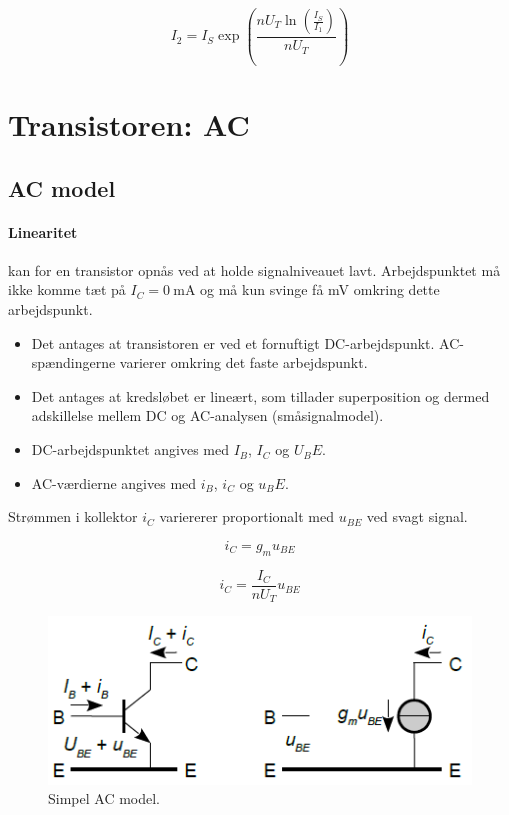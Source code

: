 \documentclass[danish]{article}
\begin{document}
\begin{equation} 
I_2 = I_S \exp{\left(\frac{n U_T \ln{\left(\frac{I_S}{I_1}\right)}}{n U_T}\right)}
\end{equation}

\newpage
\section{Transistoren: AC}
\subsection{AC model}
\paragraph{Linearitet} kan for en transistor opnås ved at holde signalniveauet lavt. Arbejdspunktet må ikke komme tæt på $I_C = \SI{0}{\milli\ampere}$ og må kun svinge få mV omkring dette arbejdspunkt. 

\begin{itemize}
	\item Det antages at transistoren er ved et fornuftigt DC-arbejdspunkt. AC-spændingerne varierer omkring det faste arbejdspunkt.
	\item Det antages at kredsløbet er lineært, som tillader superposition og dermed	adskillelse mellem DC og AC-analysen (småsignalmodel).
	\item DC-arbejdspunktet angives med $I_B$, $I_C$ og $U_BE$.
	\item AC-værdierne angives med $i_B$, $i_C$ og $u_BE$.
\end{itemize}

Strømmen i kollektor $i_C$ variererer proportionalt med $u_{BE}$ ved svagt signal.

\begin{equation} 
i_C = g_m u_{BE}
\end{equation}

\begin{equation} 
i_C = \dfrac{I_C}{n U_T} u_{BE}
\end{equation}

\begin{figure} [H]
	\centering
	\includegraphics[width=0.75\linewidth]{graphics/ACmodel}
	\caption{Simpel AC model.}
	\label{fig:ACmodel}
\end{figure}
\end{document}
